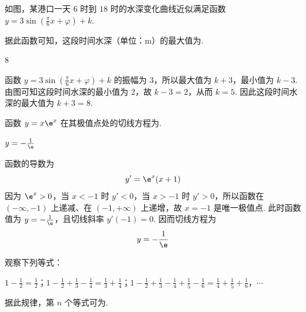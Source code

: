 \begin{problem}
如图，某港口一天 \(6\text{ 时}\)到 \(18\text{ 时}\)的水深变化曲线近似满足函数 \(y = 3\sin \left(\frac{\pi}{6} x + \varphi\right) + k\).

据此函数可知，这段时间水深（单位：\(\mathrm{m}\)）的最大值为\fillinblank{}.

\begin{center}
\begin{minipage}{0.42\linewidth}
\centering
{}
\end{minipage}
\end{center}
\end{problem}

\begin{answer}
\(8\)
\end{answer}

\begin{solution}
函数 \(y=3\sin\left(\frac{\pi}{6}x+\varphi\right)+k\) 的振幅为 \(3\)，所以最大值为 \(k+3\)，最小值为 \(k-3\). 由图可知这段时间水深的最小值为 \(2\)，故 \(k-3=2\)，从而 \(k=5\). 因此这段时间水深的最大值为 \(k+3=8\).
\end{solution}

\begin{problem}
函数 \(y = x\e^{x}\) 在其极值点处的切线方程为\fillinblank{}.
\end{problem}

\begin{answer}
\(y=-\frac{1}{\e}\)
\end{answer}

\begin{solution}
函数的导数为
\[
y'=\e^x(x+1)
\]
因为 \(\e^x>0\)，当 \(x<-1\) 时 \(y'<0\)，当 \(x>-1\) 时 \(y'>0\)，所以函数在 \(\left(-\infty,-1\right)\) 上递减、在 \(\left(-1,+\infty\right)\) 上递增，故 \(x=-1\) 是唯一极值点. 此时函数值为 \(y=-\frac{1}{\e}\)，且切线斜率 \(y'(-1)=0\). 因而切线方程为
\[
y=-\frac{1}{\e}
\]
\end{solution}

\begin{problem}
观察下列等式：

\(\displaystyle 1 - \frac{1}{2} = \frac{1}{2}\)；\(\displaystyle 1 - \frac{1}{2} + \frac{1}{3} - \frac{1}{4} = \frac{1}{3} + \frac{1}{4}\)；\(\displaystyle 1 - \frac{1}{2} + \frac{1}{3} - \frac{1}{4} + \frac{1}{5} - \frac{1}{6} = \frac{1}{4} + \frac{1}{5} + \frac{1}{6}\)，\(\cdots\)

据此规律，第 \(n\) 个等式可为\fillinblank{}.
\end{problem}


